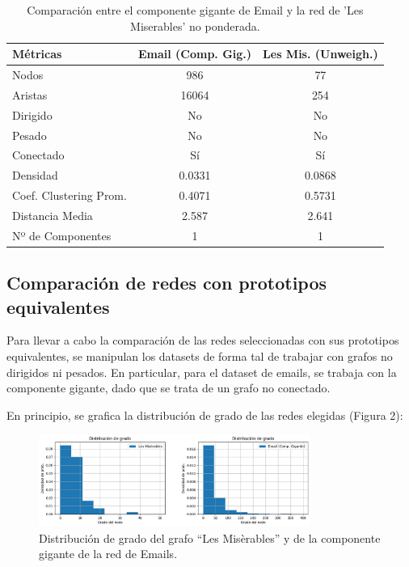 \documentclass[conference]{IEEEtran}
\begin{document}
\begin{table}[h]
    \centering
    \begin{tabular}{|l|c|c|}
        \hline
        \textbf{Métricas} & \textbf{Email (Comp. Gig.)} & \textbf{Les Mis. (Unweigh.)} \\
        \hline
        Nodos & 986 & 77 \\
        \hline
        Aristas & 16064 & 254 \\
        \hline
        Dirigido & No & No \\
        \hline
        Pesado & No & No \\
        \hline
        Conectado & Sí & Sí \\
        \hline
        Densidad & 0.0331 & 0.0868 \\
        \hline
        Coef. Clustering Prom. & 0.4071 & 0.5731 \\
        \hline        
        Distancia Media & 2.587 & 2.641 \\
        \hline
        Nº de Componentes & 1 & 1 \\
        \hline
    \end{tabular}
    \vspace{5pt}
    \caption{Comparación entre el componente gigante de Email y la red de 'Les Miserables' no ponderada.}
    \label{tab:comparacion_componentes}
\end{table}

\subsection{\textbf{Comparación de redes con prototipos equivalentes}}

\vspace{10pt}

Para llevar a cabo la comparación de las redes seleccionadas con sus prototipos equivalentes, se manipulan los datasets de forma tal de trabajar con grafos no dirigidos ni pesados. En particular, para el dataset de emails, se trabaja con la componente gigante, dado que se trata de un grafo no conectado.

\vspace{10pt}

En principio, se grafica la distribución de grado de las redes elegidas (Figura 2):

\begin{figure}[h]
    \centering
    \includegraphics[width=3.5in]{img/comp-distrib_grado.png}
    \caption{Distribución de grado del grafo “Les Misèrables” y de la componente gigante de la red de Emails.}
    \label{fig:lesmis-avg_clus}
\end{figure}
\FloatBarrier
\end{document}
